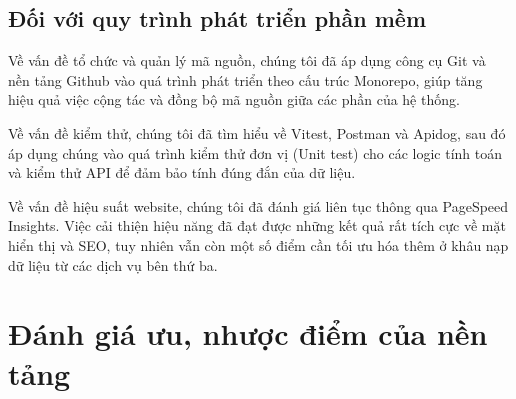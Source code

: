 \subsection{Đối với quy trình phát triển phần mềm}
Về vấn đề tổ chức và quản lý mã nguồn, chúng tôi đã áp dụng công cụ Git và nền tảng Github vào quá trình phát triển theo cấu trúc Monorepo, giúp tăng hiệu quả việc cộng tác và đồng bộ mã nguồn giữa các phần của hệ thống.

Về vấn đề kiểm thử, chúng tôi đã tìm hiểu về Vitest, Postman và Apidog, sau đó áp dụng chúng vào quá trình kiểm thử đơn vị (Unit test) cho các logic tính toán và kiểm thử API để đảm bảo tính đúng đắn của dữ liệu.

Về vấn đề hiệu suất website, chúng tôi đã đánh giá liên tục thông qua PageSpeed Insights. Việc cải thiện hiệu năng đã đạt được những kết quả rất tích cực về mặt hiển thị và SEO, tuy nhiên vẫn còn một số điểm cần tối ưu hóa thêm ở khâu nạp dữ liệu từ các dịch vụ bên thứ ba.

\section{Đánh giá ưu, nhược điểm của nền tảng}

